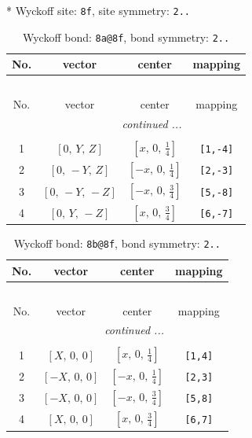 \documentclass[fleqn,8pt]{jsarticle}
\begin{document}
* Wyckoff site: {\tt 8f}, site symmetry: {\tt 2..}
\renewcommand{\arraystretch}{1.2}
\begin{longtable}{cccc}
\caption{Wyckoff bond: {\tt 8a@8f}, bond symmetry: {\tt 2..}}
 \\
 \hline \hline
No. & vector & center & mapping \\ \hline \endfirsthead

\multicolumn{3}{l}{\tablename\ \thetable{}} \\
 \hline \hline
No. & vector & center & mapping \\ \hline \endhead

 \hline \hline
\multicolumn{3}{r}{\footnotesize\it continued ...} \\ \endfoot

 \hline \hline
\multicolumn{3}{r}{} \\ \endlastfoot

1 & $\left[ 0,\, Y,\, Z \right]$ & $\left[ x,\, 0,\, \frac{1}{4} \right]$ & {\tt [1,-4]} \\ \hline
2 & $\left[ 0,\, - Y,\, Z \right]$ & $\left[ - x,\, 0,\, \frac{1}{4} \right]$ & {\tt [2,-3]} \\ \hline
3 & $\left[ 0,\, - Y,\, - Z \right]$ & $\left[ - x,\, 0,\, \frac{3}{4} \right]$ & {\tt [5,-8]} \\ \hline
4 & $\left[ 0,\, Y,\, - Z \right]$ & $\left[ x,\, 0,\, \frac{3}{4} \right]$ & {\tt [6,-7]} \\
\end{longtable}
\renewcommand{\arraystretch}{1.2}
\begin{longtable}{cccc}
\caption{Wyckoff bond: {\tt 8b@8f}, bond symmetry: {\tt 2..}}
 \\
 \hline \hline
No. & vector & center & mapping \\ \hline \endfirsthead

\multicolumn{3}{l}{\tablename\ \thetable{}} \\
 \hline \hline
No. & vector & center & mapping \\ \hline \endhead

 \hline \hline
\multicolumn{3}{r}{\footnotesize\it continued ...} \\ \endfoot

 \hline \hline
\multicolumn{3}{r}{} \\ \endlastfoot

1 & $\left[ X,\, 0,\, 0 \right]$ & $\left[ x,\, 0,\, \frac{1}{4} \right]$ & {\tt [1,4]} \\ \hline
2 & $\left[ - X,\, 0,\, 0 \right]$ & $\left[ - x,\, 0,\, \frac{1}{4} \right]$ & {\tt [2,3]} \\ \hline
3 & $\left[ - X,\, 0,\, 0 \right]$ & $\left[ - x,\, 0,\, \frac{3}{4} \right]$ & {\tt [5,8]} \\ \hline
4 & $\left[ X,\, 0,\, 0 \right]$ & $\left[ x,\, 0,\, \frac{3}{4} \right]$ & {\tt [6,7]} \\
\end{longtable}
\end{document}
